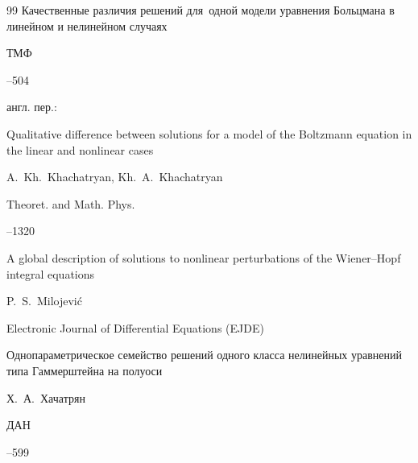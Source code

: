 \begin{thebibliography}{99}
\paper Качественные различия решений для~одной модели уравнения Больцмана в линейном и нелинейном случаях

\jour ТМФ




--504



\transl англ. пер.:~

\paper Qualitative difference between solutions for a model of the Boltzmann equation in the linear and nonlinear cases

\by  A.~Kh.~Khachatryan, Kh.~A.~Khachatryan

\jour Theoret. and Math. Phys.




--1320







\paper A global description of solutions to nonlinear perturbations of the Wiener--Hopf integral equations

\by P.~S.~Milojevi\'c

\jour Electronic Journal of Differential Equations (EJDE)










\paper Однопараметрическое семейство решений одного класса нелинейных уравнений типа Гаммерштейна на полуоси

\by  Х.~А.~Хачатрян

\jour ДАН




--599



\end{thebibliography}
